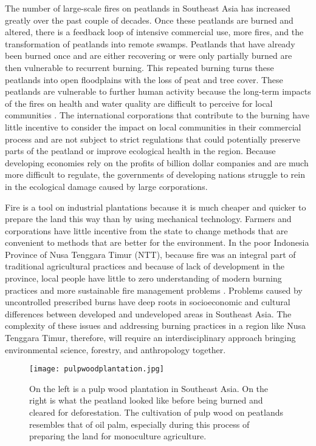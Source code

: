 The number of large-scale fires on peatlands in Southeast Asia has increased greatly over the past couple of decades. Once these peatlands are burned and altered, there is a feedback loop of intensive commercial use, more fires, and the transformation of peatlands into remote swamps. Peatlands that have already been burned once and are either recovering or were only partially burned are then vulnerable to recurrent burning. This repeated burning turns these peatlands into open floodplains with the loss of peat and tree cover. These peatlands are vulnerable to further human activity because the long-term impacts of the fires on health and water quality are difficult to perceive for local communities \citep{chokkalingam2005fire}. The international corporations that contribute to the burning have little incentive to consider the impact on local communities in their commercial process and are not subject to strict regulations that could potentially preserve parts of the peatland or improve ecological health in the region. Because developing economies rely on the profits of billion dollar companies and are much more difficult to regulate, the governments of developing nations struggle to rein in the ecological damage caused by large corporations.

Fire is a tool on industrial plantations because it is much cheaper and quicker to prepare the land this way than by using mechanical technology. Farmers and corporations have little incentive from the state to change methods that are convenient to methods that are better for the environment. In the poor Indonesia Province of Nusa Tenggara Timur (NTT), because fire was an integral part of traditional agricultural practices and because of lack of development in the province, local people have little to zero understanding of modern burning practices and more sustainable fire management problems \citep{russell2007rural}. Problems caused by uncontrolled prescribed burns have deep roots in socioeconomic and cultural differences between developed and undeveloped areas in Southeast Asia. The complexity of these issues and addressing burning practices in a region like Nusa Tenggara Timur, therefore, will require an interdisciplinary approach bringing environmental science, forestry, and anthropology together.  

\begin{figure}[ht]
  \texttt{[image: pulpwoodplantation.jpg]}
  \caption{On the left is a pulp wood plantation in Southeast Asia. On the right is what the peatland looked like before being burned and cleared for deforestation. The cultivation of pulp wood on peatlands resembles that of oil palm, especially during this process of preparing the land for monoculture agriculture.}
  \label{fig:pulpwoodplantation}
\end{figure}

